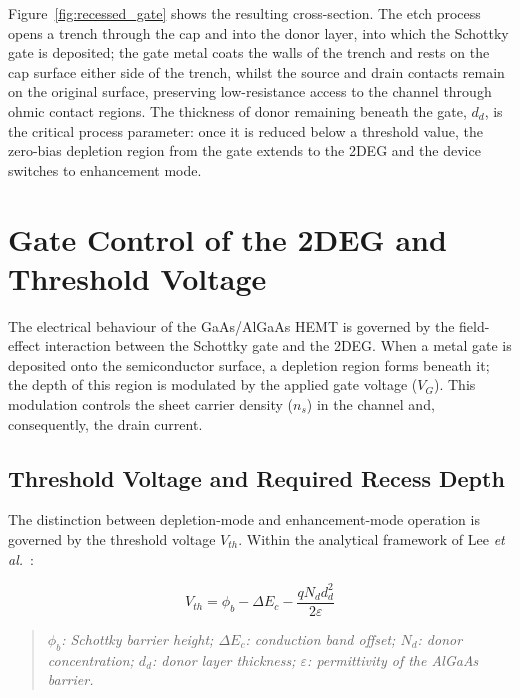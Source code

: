\vspace{2mm}

Figure~\ref{fig:recessed_gate} shows the resulting cross-section. The
etch process opens a trench through the cap and into the donor layer, into which
the Schottky gate is deposited; the gate metal coats the walls of the trench and
rests on the cap surface either side of the trench, whilst the source and drain
contacts remain on the original surface, preserving low-resistance access
to the channel through ohmic contact regions. The thickness of donor remaining 
beneath the gate, $d_d$, is the critical process parameter: once it is reduced below a threshold
value, the zero-bias depletion region from the gate extends to the 2DEG and the device
switches to enhancement mode. 



\vspace{2mm}

\section{Gate Control of the 2DEG and Threshold Voltage}

The electrical behaviour of the GaAs/AlGaAs HEMT is governed by the
field-effect interaction between the Schottky gate and the 2DEG. When a
metal gate is deposited onto the semiconductor surface, a depletion
region forms beneath it; the depth of this region is modulated by the
applied gate voltage ($V_G$). This modulation controls the sheet carrier
density ($n_s$) in the channel and, consequently, the drain current.
\cite{sze2021}

\subsection{Threshold Voltage and Required Recess Depth}
\label{sec:threshold-voltage}

The distinction between depletion-mode and enhancement-mode operation
is governed by the threshold voltage $V_{th}$. Within the analytical
framework of Lee \textit{et al.}~\cite{ivcv-hemt}:

\begin{equation}
    V_{th} = \phi_b - \Delta E_c - \frac{q N_d d_d^2}{2\varepsilon}
    \label{eq:threshold_voltage}
\end{equation}

\begin{quote}
    \footnotesize
    \textit{$\phi_b$: Schottky barrier height;
    $\Delta E_c$: conduction band offset;
    $N_d$: donor concentration;
    $d_d$: donor layer thickness;
    $\varepsilon$: permittivity of the AlGaAs barrier.}
\end{quote}

